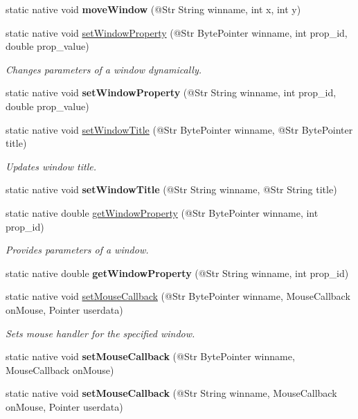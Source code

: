 \begin{DoxyCompactItemize}
static native void {\bfseries move\+Window} (@Str String winname, int x, int y)
\item 
static native void \hyperlink{group__highgui_ga0c820fdf7575d2e62d3aed900aa534cd}{set\+Window\+Property} (@Str Byte\+Pointer winname, int prop\+\_\+id, double prop\+\_\+value)
\begin{DoxyCompactList}\small\item\em Changes parameters of a window dynamically. \end{DoxyCompactList}\item 
static native void {\bfseries set\+Window\+Property} (@Str String winname, int prop\+\_\+id, double prop\+\_\+value)
\item 
static native void \hyperlink{group__highgui_gaf4453988c16611eed72c58d647d6e31d}{set\+Window\+Title} (@Str Byte\+Pointer winname, @Str Byte\+Pointer title)
\begin{DoxyCompactList}\small\item\em Updates window title. \end{DoxyCompactList}\item 
static native void {\bfseries set\+Window\+Title} (@Str String winname, @Str String title)
\item 
static native double \hyperlink{group__highgui_gabedecb2109425cb553d605080ad980a9}{get\+Window\+Property} (@Str Byte\+Pointer winname, int prop\+\_\+id)
\begin{DoxyCompactList}\small\item\em Provides parameters of a window. \end{DoxyCompactList}\item 
static native double {\bfseries get\+Window\+Property} (@Str String winname, int prop\+\_\+id)
\item 
static native void \hyperlink{group__highgui_gae53ffbc47967af79b35268d57575d6b4}{set\+Mouse\+Callback} (@Str Byte\+Pointer winname, Mouse\+Callback on\+Mouse, Pointer userdata)
\begin{DoxyCompactList}\small\item\em Sets mouse handler for the specified window. \end{DoxyCompactList}\item 
static native void {\bfseries set\+Mouse\+Callback} (@Str Byte\+Pointer winname, Mouse\+Callback on\+Mouse)
\item 
static native void {\bfseries set\+Mouse\+Callback} (@Str String winname, Mouse\+Callback on\+Mouse, Pointer userdata)
\item 

\end{DoxyCompactItemize}
